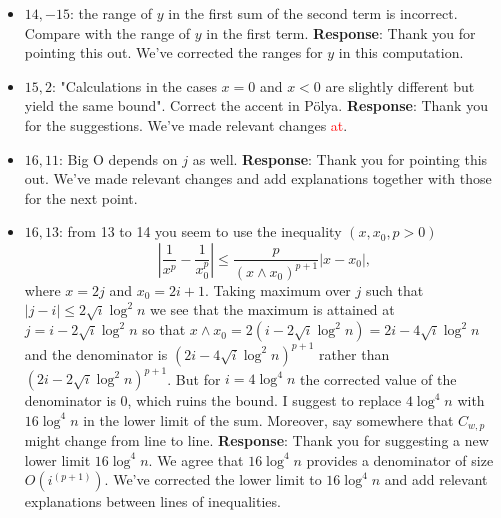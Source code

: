 \documentclass[11pt,a4paper]{article}
\numberwithin{equation}{section}
\newcommand{\abs}[1]{\left\vert #1 \right\vert}
\def\TBF#1{\textcolor{red}{#1}} %
\begin{document}
\begin{itemize}
		\item 
		$14,-15$: the range of $y$ in the first sum of the second term is incorrect. Compare with the range of $y$ in the first term.
		\subitem \textbf{Response}: Thank you for pointing this out. We've corrected the ranges for $y$ in this computation.
		
		\item
		$15,2$: "Calculations in the cases $x = 0$ and $x < 0$ are slightly different but yield the same bound". Correct the accent in P\"{o}lya.
		\subitem \textbf{Response}:
		Thank you for the suggestions. We've made relevant changes \TBF{at}.
		
		\item 
		$16,11$: Big O depends on $j$ as well.
		\subitem \textbf{Response}: Thank you for pointing this out. We've made relevant changes and add explanations together with those for the next point.
		
		\item 
		$16,13$: from 13 to 14 you seem to use the inequality $(x, x_0, p > 0)$
		$$
		\abs{\frac{1}{x^p} - \frac{1}{x_0^p}} \leq \frac{p}{\left(x\wedge x_0 \right)^{p+1}} \abs{x-x_0},
		$$
		where $x = 2j$ and $x_0 = 2i + 1$. Taking maximum over $j$ such that $\abs{j-i}\leq  2\sqrt{i} \log^2 n$
		we see that the maximum is attained at $j = i- 2\sqrt{i} \log^2 n$ so that $x\wedge x_0 = 2\left( i- 2\sqrt{i} \log^2 n
		\right) = 2i - 4 \sqrt{i} \log^2 n$
		and the denominator is $(2i - 4\sqrt{i} \log^2 n)^{p+1}$ rather than $(2i-2\sqrt{i} \log^2 n)^{p+1}$. But for $i = 4 \log^4 n$ the corrected
		value of the denominator is $0$, which ruins the bound. I suggest to replace $4 \log^4 n$ with $16 \log^4 n$ in the lower limit of the sum. Moreover, say somewhere that $C_{w,p}$ might change from line to line.
		\subitem \textbf{Response}: Thank you for suggesting a new lower limit $16 \log^4 n $. We agree that $16 \log^4 n$ provides a denominator of size $O\left(i^{(p+1)}\right)$. We've corrected the lower limit to $16\log^4 n$ and add relevant explanations between lines of inequalities. 
		

\end{itemize}
\end{document}
